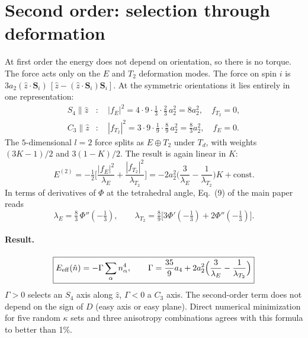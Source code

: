 \documentclass[11pt]{article}
\begin{document}
\section{Second order: selection through deformation}
At first order the energy does not depend on orientation, so there is no torque.
The force acts only on the $E$ and $T_2$ deformation modes. The force on spin $i$ is
$3a_2(\hat z\cdot\mathbf S_i)\,[\hat z-(\hat z\cdot\mathbf S_i)\mathbf S_i]$. At the
symmetric orientations it lies entirely in one representation:
\begin{align}
S_4\parallel\hat z&:\quad |f_E|^2=4\cdot9\cdot\tfrac13\cdot\tfrac23\,a_2^2=8a_2^2,
\quad f_{T_2}=0,\\
C_3\parallel\hat z&:\quad |f_{T_2}|^2=3\cdot9\cdot\tfrac19\cdot\tfrac89\,a_2^2=\tfrac83a_2^2,
\quad f_E=0 .
\end{align}
The $5$-dimensional $l=2$ force splits as $E\oplus T_2$ under $T_d$, with weights
$(3K-1)/2$ and $3(1-K)/2$. The result is again linear in $K$:
\begin{equation}
E^{(2)}=-\tfrac12\Big[\frac{|f_E|^2}{\lambda_E}+\frac{|f_{T_2}|^2}{\lambda_{T_2}}\Big]
=-2a_2^2\Big(\frac{3}{\lambda_E}-\frac{1}{\lambda_{T_2}}\Big)K+\text{const}.
\end{equation}
In terms of derivatives of $\Phi$ at the tetrahedral angle, Eq.~(9) of the main paper reads
\begin{equation}
\lambda_E=\tfrac83\,\Phi''(-\tfrac13),\qquad
\lambda_{T_2}=\tfrac89\big[3\Phi'(-\tfrac13)+2\Phi''(-\tfrac13)\big].
\end{equation}

\paragraph{Result.}
\begin{equation}
\boxed{E_{\rm eff}(\hat n)=-\Gamma\sum_\alpha n_\alpha^4,\qquad
\Gamma=\frac{35}{9}a_4+2a_2^2\Big(\frac{3}{\lambda_E}-\frac{1}{\lambda_{T_2}}\Big)}
\end{equation}
$\Gamma>0$ selects an $S_4$ axis along $\hat z$, $\Gamma<0$ a $C_3$ axis. The second-order
term does not depend on the sign of $D$ (easy axis or easy plane).
Direct numerical minimization for five random $\kappa$ sets and three anisotropy
combinations agrees with this formula to better than 1\%.
\end{document}
